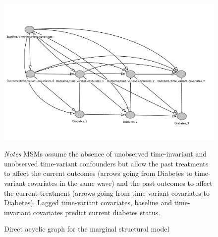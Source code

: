 \begin{figure}[!p]
\begin{center}
\caption{\label{fig:DAG_msm} Direct acyclic graph for the marginal structural model}
\includegraphics[width=\linewidth]{Chapter5/DAG/dag_msm_alt}
\end{center}
\footnotesize{\textit{Notes} \acp{MSM} assume the absence of unobserved time-invariant and unobserved time-variant confounders but allow the past treatments to affect the current outcomes  (arrows going from Diabetes to time-variant covariates in the same wave) and the past outcomes to affect the current treatment (arrows going from time-variant covariates to Diabetes).  Lagged time-variant covariates, baseline and time-invariant covariates predict current diabetes status.}
\end{figure}


